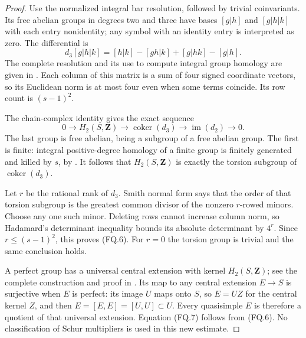 \begin{proof}
Use the normalized integral bar resolution, followed by trivial
coinvariants.  Its free abelian groups in degrees two and three have
bases $[g|h]$ and $[g|h|k]$ with each entry nonidentity; any symbol with
an identity entry is interpreted as zero.  The differential is
\[
 d_3[g|h|k]=[h|k]-[gh|k]+[g|hk]-[g|h].
                                                               \tag{FQ.8}
\]
The complete resolution and its use to compute integral group homology
are given in \cite[Definition~6.5.1, Theorem~6.5.3 and
Application~6.5.4, pp.~177--179]{FQ:Weibel1994}.
Each column of this matrix is a sum of four signed coordinate vectors,
so its Euclidean norm is at most four even when some terms coincide.
Its row count is $(s-1)^2$.

The chain-complex identity gives the exact sequence
\[
 0\longrightarrow H_2(S,\mathbf Z)
  \longrightarrow\operatorname{coker}(d_3)
  \longrightarrow\operatorname{im}(d_2)\longrightarrow0.
                                                               \tag{FQ.9}
\]
The last group is free abelian, being a subgroup of a free abelian
group.  The first is finite: integral positive-degree homology of a
finite group is finitely generated and killed by $s$, by
\cite[Theorem~6.5.8 and Corollaries~6.5.9--6.5.10, p.~180]{FQ:Weibel1994}.
It follows that $H_2(S,\mathbf Z)$ is exactly the torsion subgroup of
$\operatorname{coker}(d_3)$.

Let $r$ be the rational rank of $d_3$.  Smith normal form says that
the order of that torsion subgroup is the greatest common divisor
of the nonzero $r$-rowed minors.  Choose any one such minor.
Deleting rows cannot increase column norm, so Hadamard's determinant
inequality bounds its absolute determinant by $4^r$.
Since $r\le(s-1)^2$, this proves (FQ.6).
For $r=0$ the torsion group is trivial and the same conclusion holds.

A perfect group has a universal central extension with kernel
$H_2(S,\mathbf Z)$; see the complete construction and proof in
\cite[\S6.9, Theorem~6.9.5, pp.~198--201]{FQ:Weibel1994}.
Its map to any central extension $E\to S$ is surjective when $E$
is perfect: its image $U$ maps onto $S$, so $E=U Z$ for the
central kernel $Z$, and then $E=[E,E]=[U,U]\subset U$.
Every quasisimple $E$ is therefore a quotient of that universal
extension.  Equation (FQ.7) follows from (FQ.6).
No classification of Schur multipliers is used in this new estimate.
\end{proof}

